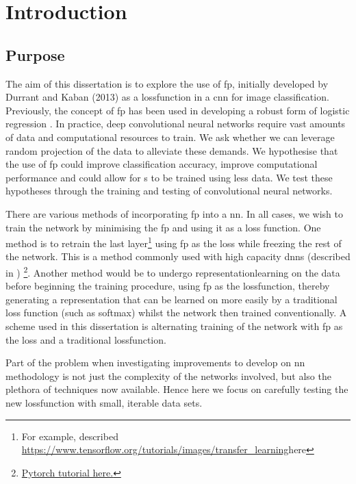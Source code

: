 \chapter{Introduction}

\section{Purpose}

The aim of this dissertation is to explore the use of  \gls{fp}, initially developed by Durrant and Kaban (2013)\cite{durrant2013sharp} as a \gls{lossfunction} in a \gls{cnn} for image classification. Previously, the concept of  \gls{fp} has been used in developing a robust form of logistic regression \cite{label_noise}. In practice, deep convolutional neural networks require vast amounts of data and computational resources to train. We ask whether we can leverage random projection of the data to alleviate these demands. We hypothesise that the use of \gls{fp} could improve classification accuracy, improve computational performance and could allow for s to be trained using less data. We test these hypotheses through the training and testing of convolutional neural networks. 
\bigskip

There are various methods of incorporating  \gls{fp} into a  \gls{nn}. In all cases, we wish to train the network by minimising the \gls{fp} and using it as a loss function. One method is to retrain the last layer\footnote{For example, described \url{https://www.tensorflow.org/tutorials/images/transfer_learning}{here}} using \gls{fp} as the loss while freezing the rest of the network. This is a method commonly used with high capacity \gls{dnn}s (described in \cite{transfer_learning}) \footnote{\href{https://pytorch.org/tutorials/beginner/transfer_learning_tutorial.html}{Pytorch tutorial here.}}. Another method would be to undergo \gls{representationlearning} on the data before beginning the training procedure, using \gls{fp} as the \gls{lossfunction}, thereby generating a representation that can be learned on more easily by a traditional loss function (such as \gls{softmax}) whilst the network then trained conventionally. A scheme used in this dissertation is alternating training of the network with  \gls{fp} as the \gls{loss} and a traditional \gls{lossfunction}. 
\bigskip

Part of the problem when investigating improvements to develop on \gls{nn} methodology is not just the complexity of the networks involved, but also the plethora of techniques now available. Hence here we focus on carefully testing the new \gls{lossfunction} with small, iterable data sets.
\bigskip

